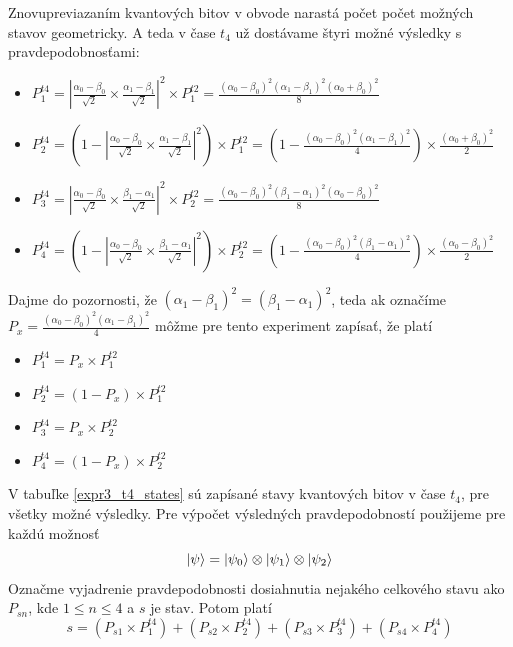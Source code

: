 Znovupreviazaním kvantových bitov v obvode narastá počet počet možných stavov
geometricky. A teda v čase \(t_4\) už dostávame štyri možné výsledky s 
pravdepodobnosťami:
\begin{itemize}
    \item[] \(P^{t4}_1 = |\frac{\alpha_0 - \beta_0}{\sqrt{2}} \times \frac{\alpha_1 - \beta_1}{\sqrt{2}}|^2 \times P^{t2}_1 = \frac{(\alpha_0 - \beta_0)^2(\alpha_1-\beta_1)^2(\alpha_0+\beta_0)^2}{8}\)

    \item[] \(P^{t4}_2 = (1-|\frac{\alpha_0 - \beta_0}{\sqrt{2}} \times \frac{\alpha_1 - \beta_1}{\sqrt{2}}|^2) \times P^{t2}_1 = (1-\frac{(\alpha_0 - \beta_0)^2(\alpha_1-\beta_1)^2}{4}) \times \frac{(\alpha_0+\beta_0)^2}{2}\)

    \item[] \(P^{t4}_3 = |\frac{\alpha_0 - \beta_0}{\sqrt{2}} \times \frac{\beta_1 - \alpha_1}{\sqrt{2}}|^2 \times P^{t2}_2 = \frac{(\alpha_0 - \beta_0)^2(\beta_1-\alpha_1)^2(\alpha_0-\beta_0)^2}{8}\)

    \item[] \(P^{t4}_4 = (1-|\frac{\alpha_0 - \beta_0}{\sqrt{2}} \times \frac{\beta_1 - \alpha_1}{\sqrt{2}}|^2) \times P^{t2}_2 = (1-\frac{(\alpha_0 - \beta_0)^2(\beta_1-\alpha_1)^2}{4}) \times \frac{(\alpha_0-\beta_0)^2}{2}\)
\end{itemize}

Dajme do pozornosti, že \((\alpha_1 - \beta_1)^2 = (\beta_1 - \alpha_1)^2\),
teda ak označíme \(P_x = \frac{(\alpha_0 - \beta_0)^2(\alpha_1-\beta_1)^2}{4}\)
môžme pre tento experiment zapísať, že platí

\begin{itemize}
    \item[] \(P^{t4}_1 = P_x \times P^{t2}_1\)

    \item[] \(P^{t4}_2 = (1-P_x) \times P^{t2}_1\)

    \item[] \(P^{t4}_3 = P_x \times P^{t2}_2\)  

    \item[] \(P^{t4}_4 = (1-P_x) \times P^{t2}_2\)
\end{itemize}

V tabuľke \ref{expr3_t4_states} sú zapísané stavy kvantových bitov v čase
\(t_4\), pre všetky možné výsledky. Pre výpočet výsledných pravdepodobností
použijeme pre každú možnosť
\[\ket{\psi} = \ket{\psi_0} \otimes \ket{\psi_1} \otimes \ket{\psi_2}\]
Označme vyjadrenie pravdepodobnosti dosiahnutia nejakého celkového stavu 
ako \(P_{sn}\), kde \(1 \leq n \leq 4\) a \(s\) je stav. Potom platí
\[s = (P_{s1} \times P^{t4}_1) + (P_{s2} \times P^{t4}_2) + (P_{s3} \times P^{t4}_3) + (P_{s4} \times P^{t4}_4)\]

